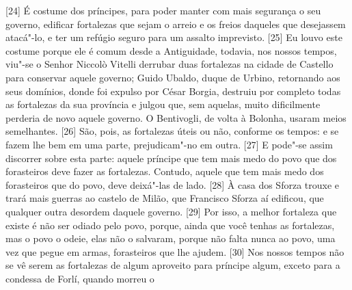 {[}24{]} É costume dos príncipes, para poder manter com mais segurança o
seu governo, edificar fortalezas que sejam o arreio e os freios daqueles
que desejassem atacá"-lo, e ter um refúgio seguro para um assalto
imprevisto. {[}25{]} Eu louvo este costume porque ele é comum desde a
Antiguidade, todavia, nos nossos tempos, viu"-se o Senhor Niccolò
Vitelli derrubar duas
fortalezas na cidade de Castello para conservar aquele governo; Guido
Ubaldo, duque de Urbino, retornando aos seus domínios, donde
foi expulso por César Borgia, destruiu por completo todas as fortalezas da sua província e
julgou que, sem aquelas, muito dificilmente perderia de novo
aquele governo. O Bentivogli, de volta à Bolonha, usaram meios
semelhantes. {[}26{]} São, pois, as fortalezas úteis ou não, conforme os
tempos: e se fazem lhe bem em uma parte, prejudicam"-no em outra.
{[}27{]} E pode"-se assim discorrer sobre esta parte: aquele príncipe que
tem mais medo do povo que dos forasteiros deve fazer as fortalezas.
Contudo, aquele que tem mais medo dos forasteiros que do povo, deve
deixá"-las de lado. {[}28{]} À casa dos Sforza trouxe e trará mais
guerras ao castelo de Milão, que Francisco Sforza aí
edificou, que
qualquer outra desordem daquele governo. {[}29{]} Por isso, a melhor
fortaleza que existe é não ser odiado pelo povo, porque, ainda que você
tenhas as fortalezas, mas o povo o odeie, elas não o salvaram, porque
não falta nunca ao povo, uma vez que pegue em armas, forasteiros que lhe
ajudem. {[}30{]} Nos nossos tempos não se vê serem as fortalezas de
algum aproveito para príncipe algum, exceto para a condessa de
Forlí, quando morreu o
